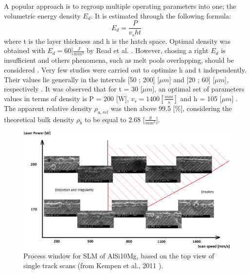 A popular approach is to regroup multiple operating parameters into one; the volumetric energy density $E_d$. It is estimated through the following formula: 
$$E_d=\frac{P}{v_s h t} $$
where t is the layer thickness and h is the hatch space.  Optimal density was obtained with $E_d=60 [\frac{J}{mm^3}$ by Read et al. \parencite{Read150417}. However, chosing a right $E_d$ is insufficient and others phenomena, such as melt pools overlapping, should be considered \parencite{Tang170309}. Very few studies were carried out to optimize h and t independently. Their values lie generally in the intervals [50 ; 200] [$\mu m$] and [20 ; 60] [$\mu m$], respectively \parencite{aboulkhair2016,Brandl121509,Kempen110817,Mertens170406}. It was observed that for t = 30 [$\mu m$], an optimal set of parameters values in terms of density is P = 200 [W], $v_s=1400 [\frac{mm}{s}]$ and h = 105 [$\mu m$] \parencite{Kempen110817}. The apparent relative density $\rho_{a,rel}$ was then above 99.5 [\%], considering the theoretical bulk density $\rho_b$ to be equal to 2.68 [$\frac{g}{mm^3}$].\\

\begin{figure}[ht]
\centering
\includegraphics[scale=0.34]{Images/Pvs}
\decoRule
\caption[Process window for SLM of AlSi10Mg, based on the top view of single track scans]{Process window for SLM of AlSi10Mg, based on the top view of single track scans (from Kempen et al., 2011 \parencite{Kempen110817}).}
\label{fig:Pvs}
\end{figure}

